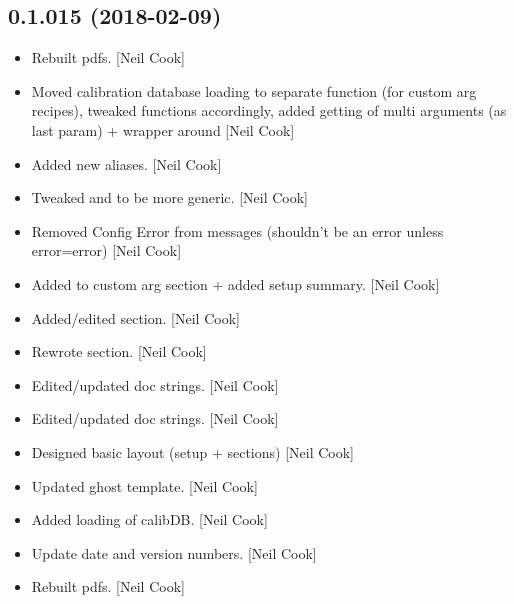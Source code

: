 \documentclass[a4paper,10pt,english]{report}
\begin{document}
\subsection{0.1.015 (2018-02-09)}
\label{\detokenize{misc/changelog:id488}}\begin{itemize}
\item {} 
Rebuilt pdfs. {[}Neil Cook{]}

\item {} 
Moved calibration database loading to separate function (for custom
arg recipes), tweaked functions accordingly, added getting of multi
arguments (as last param) + wrapper around   {[}Neil
Cook{]}

\item {} 
Added new aliases. {[}Neil Cook{]}

\item {} 
Tweaked  and  to be more generic.
{[}Neil Cook{]}

\item {} 
Removed Config Error from messages (shouldn’t be an error unless
error=error) {[}Neil Cook{]}

\item {} 
Added to custom arg section + added setup summary. {[}Neil Cook{]}

\item {} 
Added/edited section. {[}Neil Cook{]}

\item {} 
Rewrote section. {[}Neil Cook{]}

\item {} 
Edited/updated doc strings. {[}Neil Cook{]}

\item {} 
Edited/updated doc strings. {[}Neil Cook{]}

\item {} 
Designed basic layout (setup + sections) {[}Neil Cook{]}

\item {} 
Updated ghost template. {[}Neil Cook{]}

\item {} 
Added loading of calibDB. {[}Neil Cook{]}

\item {} 
Update date and version numbers. {[}Neil Cook{]}

\item {} 
Rebuilt pdfs. {[}Neil Cook{]}


\end{itemize}
\end{document}

